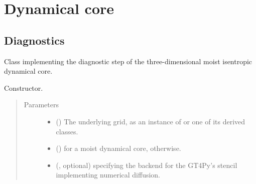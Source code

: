 \documentclass[letterpaper,10pt,english]{sphinxmanual}
\begin{document}
\section{Dynamical core}
\label{\detokenize{api:dynamical-core}}

\subsection{Diagnostics}
\label{\detokenize{api:diagnostics}}

\begin{fulllineitems}
\label{\detokenize{api:dycore.isentropic_diagnostic.IsentropicDiagnostic}}
Class implementing the diagnostic step of the three-dimensional moist isentropic dynamical core.

\begin{fulllineitems}
\label{\detokenize{api:dycore.isentropic_diagnostic.IsentropicDiagnostic.__init__}}
Constructor.
\begin{quote}\begin{description}
\item[{Parameters}] \leavevmode\begin{itemize}
\item {} 
 () \textendash{} The underlying grid, as an instance of {\hyperref[\detokenize{api:grids.xyz_grid.XYZGrid}]{}} or one of its
derived classes.

\item {} 
 () \textendash{}  for a moist dynamical core,  otherwise.

\item {} 
 (, optional) \textendash{}  specifying the backend for the GT4Py’s stencil
implementing numerical diffusion.

\end{itemize}


\end{description}
\end{quote}
\end{fulllineitems}
\end{fulllineitems}
\end{document}
